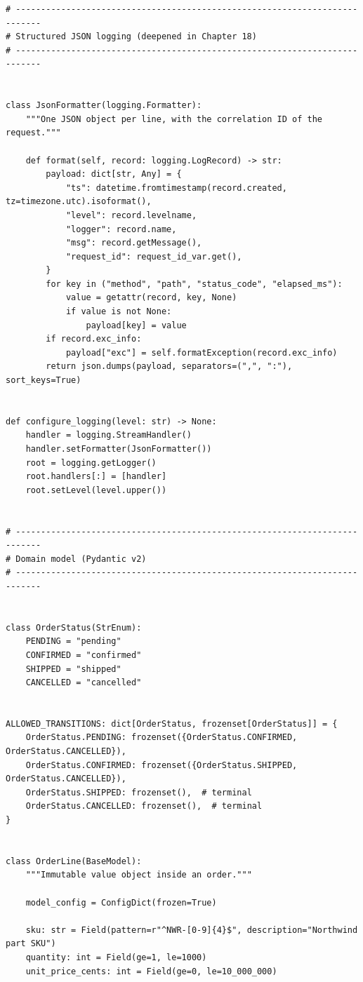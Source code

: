 \begin{verbatim}
# ---------------------------------------------------------------------------
# Structured JSON logging (deepened in Chapter 18)
# ---------------------------------------------------------------------------


class JsonFormatter(logging.Formatter):
    """One JSON object per line, with the correlation ID of the request."""

    def format(self, record: logging.LogRecord) -> str:
        payload: dict[str, Any] = {
            "ts": datetime.fromtimestamp(record.created, tz=timezone.utc).isoformat(),
            "level": record.levelname,
            "logger": record.name,
            "msg": record.getMessage(),
            "request_id": request_id_var.get(),
        }
        for key in ("method", "path", "status_code", "elapsed_ms"):
            value = getattr(record, key, None)
            if value is not None:
                payload[key] = value
        if record.exc_info:
            payload["exc"] = self.formatException(record.exc_info)
        return json.dumps(payload, separators=(",", ":"), sort_keys=True)


def configure_logging(level: str) -> None:
    handler = logging.StreamHandler()
    handler.setFormatter(JsonFormatter())
    root = logging.getLogger()
    root.handlers[:] = [handler]
    root.setLevel(level.upper())


# ---------------------------------------------------------------------------
# Domain model (Pydantic v2)
# ---------------------------------------------------------------------------


class OrderStatus(StrEnum):
    PENDING = "pending"
    CONFIRMED = "confirmed"
    SHIPPED = "shipped"
    CANCELLED = "cancelled"


ALLOWED_TRANSITIONS: dict[OrderStatus, frozenset[OrderStatus]] = {
    OrderStatus.PENDING: frozenset({OrderStatus.CONFIRMED, OrderStatus.CANCELLED}),
    OrderStatus.CONFIRMED: frozenset({OrderStatus.SHIPPED, OrderStatus.CANCELLED}),
    OrderStatus.SHIPPED: frozenset(),  # terminal
    OrderStatus.CANCELLED: frozenset(),  # terminal
}


class OrderLine(BaseModel):
    """Immutable value object inside an order."""

    model_config = ConfigDict(frozen=True)

    sku: str = Field(pattern=r"^NWR-[0-9]{4}$", description="Northwind part SKU")
    quantity: int = Field(ge=1, le=1000)
    unit_price_cents: int = Field(ge=0, le=10_000_000)



\end{verbatim}
